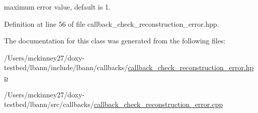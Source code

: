 maximum error value, default is 1. 

Definition at line 56 of file callback\+\_\+check\+\_\+reconstruction\+\_\+error.\+hpp.



The documentation for this class was generated from the following files\+:\begin{DoxyCompactItemize}
\item 
/\+Users/mckinney27/doxy-\/testbed/lbann/include/lbann/callbacks/\hyperlink{callback__check__reconstruction__error_8hpp}{callback\+\_\+check\+\_\+reconstruction\+\_\+error.\+hpp}\item 
/\+Users/mckinney27/doxy-\/testbed/lbann/src/callbacks/\hyperlink{callback__check__reconstruction__error_8cpp}{callback\+\_\+check\+\_\+reconstruction\+\_\+error.\+cpp}\end{DoxyCompactItemize}
